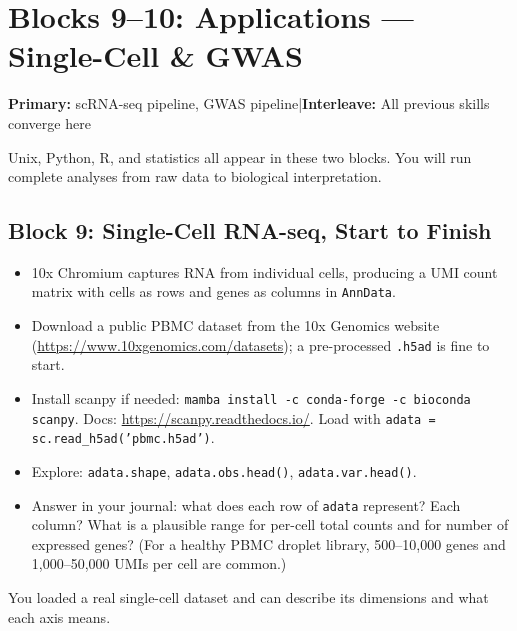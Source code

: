 \chapter{Blocks 9--10: Applications --- Single-Cell \& GWAS}\label{chap:apps}

\textbf{Primary:} scRNA-seq pipeline, GWAS pipeline\quad|\quad\textbf{Interleave:} All previous skills converge here

\begin{brainbox}
Unix, Python, R, and statistics all appear in these two blocks. You will run complete analyses from raw data to biological interpretation.
\end{brainbox}


\section{Block 9: Single-Cell RNA-seq, Start to Finish}

\begin{itemize}[nosep]
  \item 10x Chromium captures RNA from individual cells, producing a UMI count matrix with cells as rows and genes as columns in \texttt{AnnData}.
  \item Download a public PBMC dataset from the 10x Genomics website (\url{https://www.10xgenomics.com/datasets}); a pre-processed \texttt{.h5ad} is fine to start.
  \item Install scanpy if needed: \texttt{mamba install -c conda-forge -c bioconda scanpy}. Docs: \url{https://scanpy.readthedocs.io/}. Load with \texttt{adata = sc.read\_h5ad('pbmc.h5ad')}.
  \item Explore: \texttt{adata.shape}, \texttt{adata.obs.head()}, \texttt{adata.var.head()}.
  \item Answer in your journal: what does each row of \texttt{adata} represent? Each column? What is a plausible range for per-cell total counts and for number of expressed genes? (For a healthy PBMC droplet library, 500--10{,}000 genes and 1{,}000--50{,}000 UMIs per cell are common.)
\end{itemize}
\begin{winbox}[Checkpoint]
You loaded a real single-cell dataset and can describe its dimensions and what each axis means.
\end{winbox}

